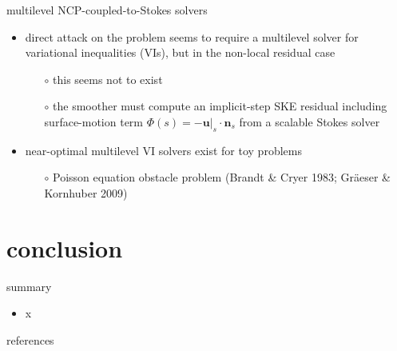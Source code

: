\documentclass[svgnames,
               hyperref={colorlinks,citecolor=DeepPink4,linkcolor=FireBrick,urlcolor=Maroon},
               usepdftitle=false]  %
               {beamer}
\makeatletter
\newcommand\notsotiny{\@setfontsize\notsotiny\@viipt\@viiipt}
\newcommand{\bn}{\mathbf{n}}
\newcommand{\bu}{\mathbf{u}}
\makeatother
\begin{document}
\begin{frame}{multilevel NCP-coupled-to-Stokes solvers}

\begin{itemize}
\item direct attack on the problem seems to require a \alert{multilevel} solver for \alert{variational inequalities} (VIs), but in the \alert{non-local residual case}
    \begin{itemize}
    \item[$\circ$] this seems not to exist
    \item[$\circ$] the \alert{smoother} must compute an implicit-step SKE residual including surface-motion term $\Phi(s) = - \bu|_s\cdot \bn_s$ from a scalable Stokes solver
    \end{itemize}
\item near-optimal multilevel VI solvers exist for toy problems
    \begin{itemize}
    \item[$\circ$] Poisson equation obstacle problem (Brandt \& Cryer 1983; Gr\"aeser \& Kornhuber 2009)
    \end{itemize}
\end{itemize}
\end{frame}


\section{conclusion}

\begin{frame}{\alert{summary}}

\begin{itemize}
\item x
\end{itemize}
\end{frame}


\begin{frame}{references}

{\scriptsize

}
\end{frame}
\end{document}
